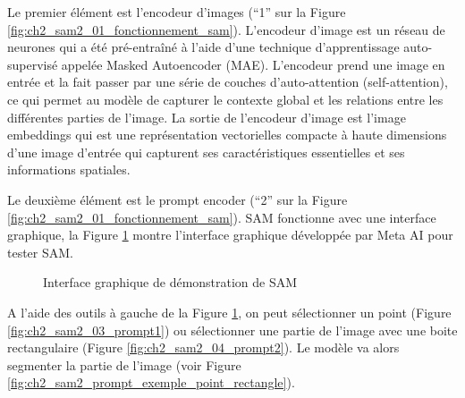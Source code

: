 Le premier élément est l’encodeur d’images (``1'' sur la Figure \ref{fig:ch2_sam2_01_fonctionnement_sam}). L’encodeur d’image est un réseau de neurones qui a été pré-entraîné à l'aide d'une technique d'apprentissage auto-supervisé appelée Masked Autoencoder (MAE). L'encodeur prend une image en entrée et la fait passer par une série de couches d'auto-attention (self-attention), ce qui permet au modèle de capturer le contexte global et les relations entre les différentes parties de l'image. La sortie de l’encodeur d’image est l’image embeddings qui est une représentation vectorielles compacte à haute dimensions d'une image d'entrée qui capturent ses caractéristiques essentielles et ses informations spatiales.

Le deuxième élément est le prompt encoder (``2'' sur la Figure \ref{fig:ch2_sam2_01_fonctionnement_sam}). SAM fonctionne avec une interface graphique, la Figure \ref{fig:ch2_sam2_02_prompt_encoder} 
montre l'interface graphique développée par Meta AI pour tester SAM.

\begin{figure}[H]
    \centering
    \caption{Interface graphique de démonstration de SAM \cite{fair_segment_nodate}}
    \label{fig:ch2_sam2_02_prompt_encoder}
\end{figure}

A l’aide des outils à gauche de la Figure \ref{fig:ch2_sam2_02_prompt_encoder}, on peut sélectionner un point (Figure \ref{fig:ch2_sam2_03_prompt1}) ou sélectionner une partie de l’image avec une boite rectangulaire (Figure \ref{fig:ch2_sam2_04_prompt2}). Le modèle va alors segmenter la partie de l’image (voir Figure \ref{fig:ch2_sam2_prompt_exemple_point_rectangle}).

